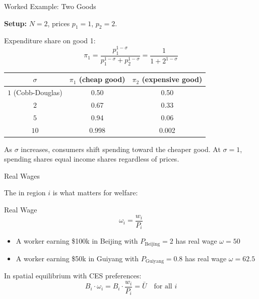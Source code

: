 \documentclass{beamer}
\begin{document}
\begin{frame}{Worked Example: Two Goods}

    \textbf{Setup:} $N=2$, prices $p_1 = 1$, $p_2 = 2$.

    \vspace{0.3em}
    Expenditure share on good 1:
    \[ \pi_1 = \frac{p_1^{1-\sigma}}{p_1^{1-\sigma} + p_2^{1-\sigma}} = \frac{1}{1 + 2^{1-\sigma}} \]

    \vspace{0.3em}
    {\small
    \begin{center}
    \begin{tabular}{ccc}
        \toprule
        $\sigma$ & $\pi_1$ (cheap good) & $\pi_2$ (expensive good) \\
        \midrule
        $1$ (Cobb-Douglas) & 0.50 & 0.50 \\
        $2$ & 0.67 & 0.33 \\
        $5$ & 0.94 & 0.06 \\
        $10$ & 0.998 & 0.002 \\
        \bottomrule
    \end{tabular}
    \end{center}
    }

    \vspace{0.3em}
     As $\sigma$ increases, consumers shift spending toward the cheaper good. At $\sigma=1$, spending shares equal income shares regardless of prices.

\end{frame}

\begin{frame}{Real Wages}

    The  in region $i$ is what matters for welfare:

    \vspace{0.3em}
    \begin{block}{Real Wage}
        \vspace{-0.5em}
        \[ \omega_i = \frac{w_i}{P_i} \]
    \end{block}

    \vspace{0.5em}
    \begin{itemize}
        \item A worker earning \$100k in Beijing with $P_{\text{Beijing}} = 2$ has real wage $\omega = 50$
        \item A worker earning \$50k in Guiyang with $P_{\text{Guiyang}} = 0.8$ has real wage $\omega = 62.5$
    \end{itemize}

    \vspace{0.5em}
    In spatial equilibrium with CES preferences:
    \[ B_i \cdot \omega_i = B_i \cdot \frac{w_i}{P_i} = \bar{U} \quad \text{for all } i \]

    \vspace{0.3em}

\end{frame}
\end{document}

